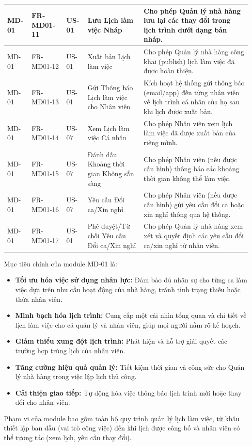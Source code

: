 \begin{longtable}{|m{2cm}|m{2.5cm}|m{2cm}|m{4cm}|m{4.5cm}|}
    \hline
    MD-01 & FR-MD01-11 & US-01 & Lưu Lịch làm việc Nháp & Cho phép Quản lý nhà hàng lưu lại các thay đổi trong lịch trình dưới dạng bản nháp. \\
    \hline
    MD-01 & FR-MD01-12 & US-01 & Xuất bản Lịch làm việc & Cho phép Quản lý nhà hàng công khai (publish) lịch làm việc đã được hoàn thiện. \\
    \hline
    MD-01 & FR-MD01-13 & US-01 & Gửi Thông báo Lịch làm việc cho Nhân viên & Kích hoạt hệ thống gửi thông báo (email/app) đến từng nhân viên về lịch trình cá nhân của họ sau khi lịch được xuất bản. \\
    \hline
    MD-01 & FR-MD01-14 & US-07 & Xem Lịch làm việc Cá nhân & Cho phép Nhân viên xem lịch làm việc đã được xuất bản của riêng mình. \\
    \hline
    MD-01 & FR-MD01-15 & US-07 & Đánh dấu Khoảng thời gian Không sẵn sàng & Cho phép Nhân viên (nếu được cấu hình) thông báo các khoảng thời gian không thể làm việc. \\
    \hline
    MD-01 & FR-MD01-16 & US-07 & Yêu cầu Đổi ca/Xin nghỉ & Cho phép Nhân viên (nếu được cấu hình) gửi yêu cầu đổi ca hoặc xin nghỉ thông qua hệ thống. \\
    \hline
    MD-01 & FR-MD01-17 & US-01 & Phê duyệt/Từ chối Yêu cầu Đổi ca/Xin nghỉ & Cho phép Quản lý nhà hàng xem xét và quyết định các yêu cầu đổi ca/xin nghỉ từ nhân viên. \\
    \hline
    
    \end{longtable}

\label{sssec:md01_objectives_scope}
Mục tiêu chính của module MD-01 là:
\begin{itemize}
    \item \textbf{Tối ưu hóa việc sử dụng nhân lực:} Đảm bảo đủ nhân sự cho từng ca làm việc dựa trên nhu cầu hoạt động của nhà hàng, tránh tình trạng thiếu hoặc thừa nhân viên.
    \item \textbf{Minh bạch hóa lịch trình:} Cung cấp một cái nhìn tổng quan và chi tiết về lịch làm việc cho cả quản lý và nhân viên, giúp mọi người nắm rõ kế hoạch.
    \item \textbf{Giảm thiểu xung đột lịch trình:} Phát hiện và hỗ trợ giải quyết các trường hợp trùng lịch của nhân viên.
    \item \textbf{Tăng cường hiệu quả quản lý:} Tiết kiệm thời gian và công sức cho Quản lý nhà hàng trong việc lập lịch thủ công.
    \item \textbf{Cải thiện giao tiếp:} Tự động hóa việc thông báo lịch trình mới hoặc thay đổi cho nhân viên.
\end{itemize}
Phạm vi của module bao gồm toàn bộ quy trình quản lý lịch làm việc, từ khâu thiết lập ban đầu (vai trò công việc) đến khi lịch được công bố và nhân viên có thể tương tác (xem lịch, yêu cầu thay đổi).

